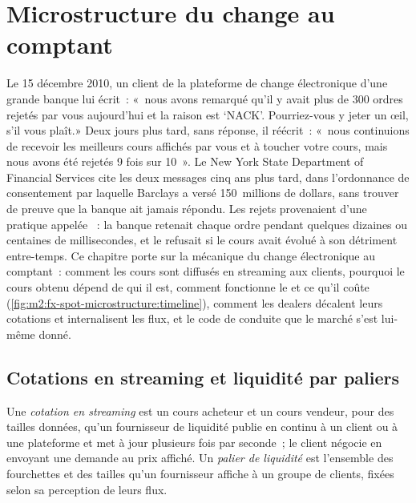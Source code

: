 \chapter{Microstructure du change au comptant}\label{ch:m2:fx-spot-microstructure}

Le 15 décembre 2010, un client de la plateforme de change électronique d'une grande banque lui
écrit~: «~nous avons remarqué qu'il y avait plus de 300 ordres rejetés par vous
aujourd'hui et la raison est `NACK'. Pourriez-vous y jeter un œil, s'il vous plaît.» Deux jours
plus tard, sans réponse, il réécrit~: «~nous continuions de recevoir les meilleurs cours affichés
par vous et à toucher votre cours, mais nous avons été rejetés 9 fois sur
10~». Le New York State Department of Financial Services cite les deux messages
cinq ans plus tard, dans l'ordonnance de consentement par laquelle Barclays a versé
150~millions de dollars, sans trouver de preuve que la banque ait jamais répondu. Les rejets
provenaient d'une pratique appelée ~: la banque retenait chaque ordre pendant quelques dizaines ou
centaines de millisecondes, et le refusait si le cours avait évolué à son détriment
entre-temps. Ce chapitre porte sur la mécanique du change électronique
au comptant~: comment les cours sont diffusés en streaming aux clients, pourquoi le cours obtenu
dépend de qui il est, comment fonctionne le  et ce qu'il coûte
(\cref{fig:m2:fx-spot-microstructure:timeline}), comment les dealers décalent leurs cotations et
internalisent les flux, et le code de conduite que le marché s'est lui-même donné.

\section{Cotations en streaming et liquidité par paliers}

\begin{definition}\label{def:m2:fx-spot-microstructure:stream}
Une \emph{cotation en streaming} est un cours acheteur et un cours vendeur, pour des tailles données,
qu'un fournisseur de liquidité publie en continu à un client ou à une
plateforme et met à jour plusieurs fois par seconde~; le client négocie en envoyant une
demande au prix affiché. Un \emph{palier de liquidité} est
l'ensemble des fourchettes et des tailles qu'un fournisseur affiche à un groupe de clients, fixées selon
sa perception de leurs flux.
\end{definition}

